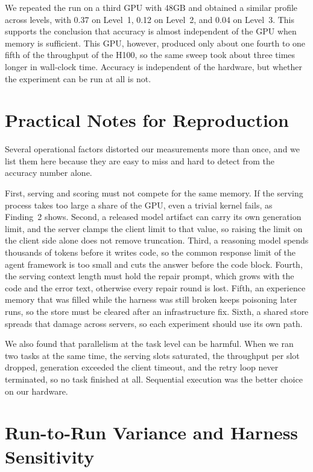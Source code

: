 We repeated the run on a third GPU with 48GB and obtained a similar profile across levels, with 0.37
on Level~1, 0.12 on Level~2, and 0.04 on Level~3. This supports the conclusion that accuracy is
almost independent of the GPU when memory is sufficient. This GPU, however, produced only about one
fourth to one fifth of the throughput of the H100, so the same sweep took about three times longer
in wall-clock time. Accuracy is independent of the hardware, but whether the experiment can be run
at all is not.

\section{Practical Notes for Reproduction}\label{sec:notes}

Several operational factors distorted our measurements more than once, and we list them here
because they are easy to miss and hard to detect from the accuracy number alone.

First, serving and scoring must not compete for the same memory. If the serving process takes too
large a share of the GPU, even a trivial kernel fails, as Finding~2 shows. Second, a released model
artifact can carry its own generation limit, and the server clamps the client limit to that value,
so raising the limit on the client side alone does not remove truncation. Third, a reasoning model
spends thousands of tokens before it writes code, so the common response limit of the agent
framework is too small and cuts the answer before the code block. Fourth, the serving context length
must hold the repair prompt, which grows with the code and the error text, otherwise every repair
round is lost. Fifth, an experience memory that was filled while the harness was still broken keeps
poisoning later runs, so the store must be cleared after an infrastructure fix. Sixth, a shared
store spreads that damage across servers, so each experiment should use its own path.

We also found that parallelism at the task level can be harmful. When we ran two tasks at the same
time, the serving slots saturated, the throughput per slot dropped, generation exceeded the client
timeout, and the retry loop never terminated, so no task finished at all. Sequential execution was
the better choice on our hardware.

\section{Run-to-Run Variance and Harness Sensitivity}\label{sec:app-variance}

